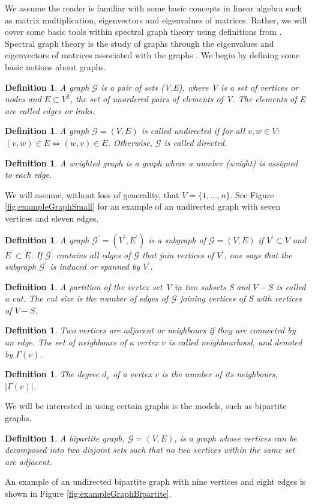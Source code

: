 \documentclass[12pt]{article}
\numberwithin{equation}{section}
\newtheorem{definition}[theorem]{Definition}
\newcommand*\abs[1]{\left\vert#1\right\vert}
\begin{document}
We assume the reader is familiar with some basic concepts in linear algebra such as matrix multiplication, eigenvectors and eigenvalues of matrices. Rather, we will cover some basic tools within spectral graph theory using definitions from \cite{For10,New06a, Spi12, Spi07}. Spectral graph theory is the study of graphs through the eigenvalues and eigenvectors of matrices associated with the graphs \cite{Spi12}. We begin by defining some basic notions about graphs.
\begin{definition}
\label{def:graph}
	A graph $\mathcal{G}$ is a pair of sets (V,E), where V is a set of vertices or nodes and $E \subset V^{2}$, the set of unordered pairs of elements of V. The elements of E are called edges or links.
\end{definition}
\begin{definition}
\label{def:undirectedGraph}
	A graph $\mathcal{G} = (V,E)$ is called undirected if for all $v,w \in V$: $(v,w) \in E \iff (w,v) \in E$. Otherwise, $\mathcal{G}$ is called directed.
\end{definition}
\begin{definition}
\label{def:weightedGraph}
	A weighted graph is a graph where a number (weight) is assigned to each edge.
\end{definition}
We will assume, without loss of generality, that $V = \{1,\dots,n\}$. See Figure \ref{fig:exampleGraphSmall} for an example of an undirected graph with seven vertices and eleven edges.
\begin{definition}
\label{def:subGraph}
	A graph $\mathcal{G}^{\prime} = (V^{\prime},E^{\prime})$ is a subgraph of $\mathcal{G} = (V,E)$ if $V^{\prime} \subset V$ and $E^{\prime} \subset E$. If $\mathcal{G}^{\prime}$ contains all edges of $\mathcal{G}$ that join vertices of $V^{\prime}$, one says that the subgraph $\mathcal{G}^{\prime}$ is induced or spanned by $V^{\prime}$.
\end{definition}
\begin{definition}
\label{def:cuts}
	A partition of the vertex set V in two subsets S and $V-S$ is called a cut. The cut size is the number of edges of $\mathcal{G}$ joining vertices of S with vertices of $V-S$.
\end{definition}
\begin{definition}
\label{def:neighbourhoodNode}
	Two vertices are adjacent or neighbours if they are connected by an edge. The set of neighbours of a vertex $v$ is called neighbourhood, and denoted by $\Gamma(v)$.
\end{definition}
\begin{definition}
\label{def:degreeNode}
	The degree $d_{v}$ of a vertex $v$ is the number of its neighbours, $\abs{\Gamma(v)}$.
\end{definition}
We will be interested in using certain graphs is the models, such as bipartite graphs.
\begin{definition}
\label{def:bipartiteGraph}
	A bipartite graph, $\mathcal{G} = (V,E)$, is a graph whose vertices can be decomposed into two disjoint sets such that no two vertices within the same set are adjacent.
\end{definition}
An example of an undirected bipartite graph with nine vertices and eight edges is shown in Figure \ref{fig:exampleGraphBipartite}.
\end{document}
